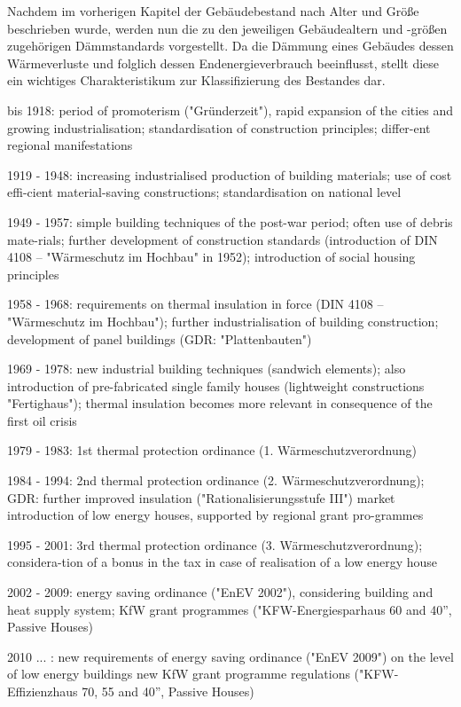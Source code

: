 Nachdem im vorherigen Kapitel der Gebäudebestand nach Alter und Größe beschrieben wurde, werden nun die zu den jeweiligen Gebäudealtern und -größen zugehörigen Dämmstandards vorgestellt. 
Da die Dämmung eines Gebäudes dessen Wärmeverluste und folglich dessen Endenergieverbrauch beeinflusst, stellt diese ein wichtiges Charakteristikum zur Klassifizierung des Bestandes dar.


bis 1918: period of promoterism ("Gründerzeit"), rapid expansion of the cities and growing industrialisation; standardisation of construction principles; differ-ent regional manifestations

1919 - 1948: increasing industrialised production of building materials; use of cost effi-cient material-saving constructions; standardisation on national level

1949 - 1957: simple building techniques of the post-war period; often use of debris mate-rials; further development of construction standards (introduction of DIN 4108 – "Wärmeschutz im Hochbau" in 1952); introduction of social housing principles

1958 - 1968: requirements on thermal insulation in force (DIN 4108 – "Wärmeschutz im Hochbau"); further industrialisation of building construction; development of panel buildings (GDR: "Plattenbauten")

1969 - 1978: new industrial building techniques (sandwich elements); also introduction of pre-fabricated single family houses (lightweight constructions "Fertighaus"); thermal insulation becomes more relevant in consequence of the first oil crisis

1979 - 1983: 1st thermal protection ordinance (1. Wärmeschutzverordnung)

1984 - 1994: 2nd thermal protection ordinance (2. Wärmeschutzverordnung); GDR: further improved insulation ("Rationalisierungsstufe III")
market introduction of low energy houses, supported by regional grant pro-grammes

1995 - 2001: 3rd thermal protection ordinance (3. Wärmeschutzverordnung); considera-tion of a bonus in the tax in case of realisation of a low energy house

2002 - 2009: energy saving ordinance ("EnEV 2002"), considering building and heat supply system; KfW grant programmes ("KFW-Energiesparhaus 60 and 40”, Passive Houses)

2010 ... : new requirements of energy saving ordinance ("EnEV 2009") on the level of low energy buildings
new KfW grant programme regulations ("KFW-Effizienzhaus 70, 55 and 40”, Passive Houses)

